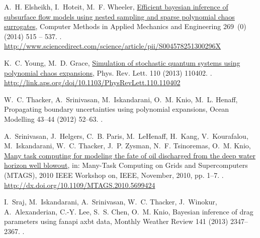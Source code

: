 \documentclass[review,12pt]{elsarticle}
\begin{document}
\begin{thebibliography}{10}
A.~H. Elsheikh, I.~Hoteit, M.~F. Wheeler,
  \href{http://www.sciencedirect.com/science/article/pii/S004578251300296X}{Efficient
  bayesian inference of subsurface flow models using nested sampling and sparse
  polynomial chaos surrogates}, Computer Methods in Applied Mechanics and
  Engineering 269~(0) (2014) 515 -- 537.
\newblock \href {http://dx.doi.org/http://dx.doi.org/10.1016/j.cma.2013.11.001}
  {}.
\newline\urlprefix\url{http://www.sciencedirect.com/science/article/pii/S004578251300296X}

K.~C. Young, M.~D. Grace,
  \href{http://link.aps.org/doi/10.1103/PhysRevLett.110.110402}{Simulation of
  stochastic quantum systems using polynomial chaos expansions}, Phys. Rev.
  Lett. 110 (2013) 110402.
\newblock \href {http://dx.doi.org/10.1103/PhysRevLett.110.110402}
  {}.
\newline\urlprefix\url{http://link.aps.org/doi/10.1103/PhysRevLett.110.110402}

W.~C. Thacker, A.~Srinivasan, M.~Iskandarani, O.~M. Knio, M.~L. Henaff,
  Propagating boundary uncertainties using polynomial expansions, Ocean
  Modelling 43--44 (2012) 52--63.
\newblock \href {http://dx.doi.org/10.1016/j.ocemod.2011.11.011}
  {}.

A.~Srinivasan, J.~Helgers, C.~B. Paris, M.~LeHenaff, H.~Kang, V.~Kourafalou,
  M.~Iskandarani, W.~C. Thacker, J.~P. Zysman, N.~F. Tsinoremas, O.~M. Knio,
  \href{http://dx.doi.org/10.1109/MTAGS.2010.5699424}{Many task computing for
  modeling the fate of oil discharged from the deep water horizon well
  blowout}, in: Many-Task Computing on Grids and Supercomputers (MTAGS), 2010
  IEEE Workshop on, IEEE, November, 2010, pp. 1--7.
\newblock \href {http://dx.doi.org/10.1109/MTAGS.2010.5699424}
  {}.
\newline\urlprefix\url{http://dx.doi.org/10.1109/MTAGS.2010.5699424}

I.~Sraj, M.~Iskandarani, A.~Srinivasan, W.~C. Thacker, J.~Winokur,
  A.~Alexanderian, C.-Y. Lee, S.~S. Chen, O.~M. Knio, Bayesian inference of
  drag parameters using fanapi axbt data, Monthly Weather Review 141 (2013)
  2347--2367.
\newblock \href {http://dx.doi.org/10.1175/MWR-D-12-00228.1}
  {}.


\end{thebibliography}
\end{document}
